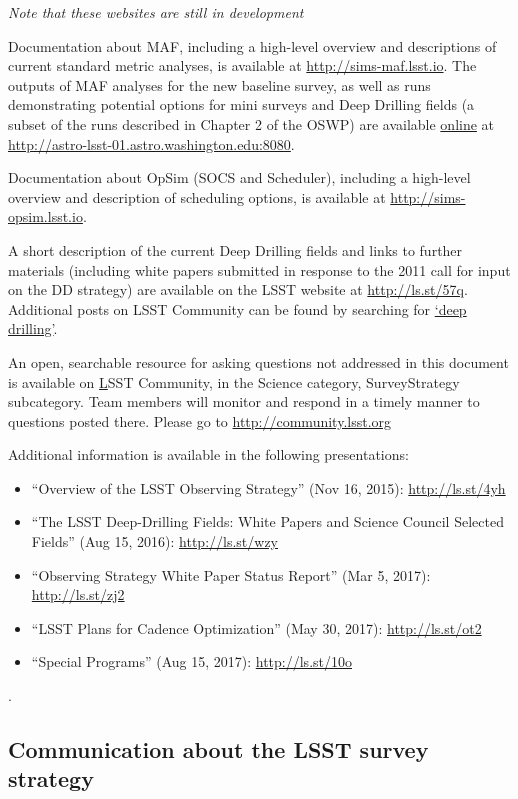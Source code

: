 \documentclass[DM,lsstdraft,toc,usenatbib]{lsstdoc}
\begin{document}
{\it Note that these websites are still in development}

Documentation about MAF, including a high-level overview and descriptions of current standard metric analyses, is available at \url{http://sims-maf.lsst.io}. 
The outputs of MAF analyses for the new baseline survey, as well as runs demonstrating potential options for mini surveys and Deep 
Drilling fields (a subset of the runs described in Chapter 2 of the OSWP) are available \href{http://astro-lsst-01.astro.washington.edu:8080}{online} at \url{http://astro-lsst-01.astro.washington.edu:8080}. 

Documentation about OpSim (SOCS and Scheduler), including a high-level overview and description of scheduling options, is available at \url{http://sims-opsim.lsst.io}.

A short description of the current Deep Drilling fields and links to further materials (including white papers submitted in response to the 2011 call for input on the DD strategy) are available on the LSST website at \href{https://www.lsst.org/scientists/survey-design/ddf}{http://ls.st/57q}. Additional posts on LSST Community can be found by searching for \href{https://community.lsst.org/search?q=deep%20drilling}{`deep drilling'}. 

An open, searchable resource for asking questions not addressed in this document is available on \href{http://community.lsst.org}LSST Community, in the Science category, SurveyStrategy subcategory. Team members will monitor and respond in a timely manner to questions posted there.  Please go to \url{http://community.lsst.org}

Additional information is available in the following presentations:
\begin{itemize}
\item ``Overview of the LSST Observing Strategy'' (Nov 16, 2015): \url{http://ls.st/4yh}
\item ``The LSST Deep-Drilling Fields: White Papers and Science Council Selected Fields'' (Aug 15, 2016): \url{http://ls.st/wzy}
\item ``Observing Strategy White Paper Status Report'' (Mar 5, 2017): \url{http://ls.st/zj2}
\item ``LSST Plans for Cadence Optimization'' (May 30, 2017): \url{http://ls.st/ot2}
\item ``Special Programs'' (Aug 15, 2017): \url{http://ls.st/10o}
\end{itemize}.


\subsection{Communication about the LSST survey strategy} 
\end{document}
